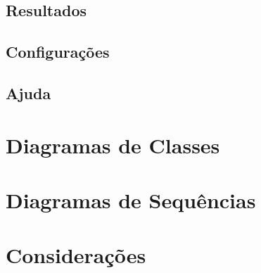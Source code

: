 \subsection{Resultados}
\subsection{Configurações}
\subsection{Ajuda}

\section{Diagramas de Classes}

\section{Diagramas de Sequências}
\section{Considerações}
